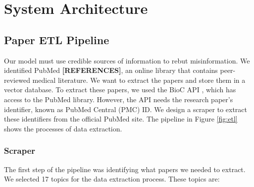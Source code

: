 



\chapter{System Architecture}  

\section{Paper ETL Pipeline}

Our model must use credible sources of information to rebut misinformation. We identified PubMed \textbf{[REFERENCES]}, an online library that contains peer-reviewed medical literature. We want to extract the papers and store them in a vector database. To extract these papers, we used the BioC API \cite{bioinformatics}, which has access to the PubMed library. However, the API needs the research paper's identifier, known as PubMed Central (PMC) ID. We design a scraper to extract these identifiers from the official PubMed site. The pipeline in Figure \ref{fig:etl} shows the processes of data extraction. 

\subsection{Scraper}
The first step of the pipeline was identifying what papers we needed to extract. We selected 17 topics for the data extraction process. These topics are:


